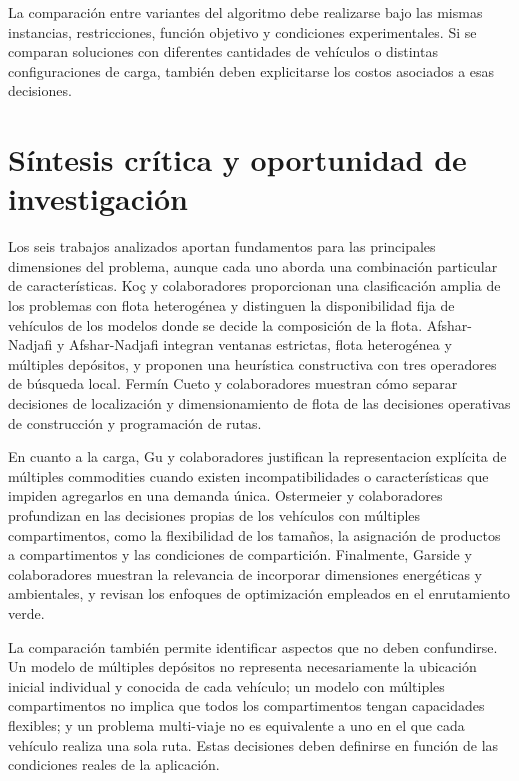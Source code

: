 La comparación entre variantes del algoritmo debe realizarse bajo las mismas instancias, restricciones, función objetivo y condiciones experimentales. Si se comparan soluciones con diferentes cantidades de vehículos o distintas configuraciones de carga, también deben explicitarse los costos asociados a esas decisiones.

\section{Síntesis crítica y oportunidad de investigación}
\label{sec:sintesis}

Los seis trabajos analizados aportan fundamentos para las principales dimensiones del problema, aunque cada uno aborda una combinación particular de características. Ko\c{c} y colaboradores proporcionan una clasificación amplia de los problemas con flota heterogénea y distinguen la disponibilidad fija de vehículos de los modelos donde se decide la composición de la flota. Afshar-Nadjafi y Afshar-Nadjafi integran ventanas estrictas, flota heterogénea y múltiples depósitos, y proponen una heurística constructiva con tres operadores de búsqueda local. Fermín Cueto y colaboradores muestran cómo separar decisiones de localización y dimensionamiento de flota de las decisiones operativas de construcción y programación de rutas.

En cuanto a la carga, Gu y colaboradores justifican la representacion explícita de múltiples commodities cuando existen incompatibilidades o características que impiden agregarlos en una demanda única. Ostermeier y colaboradores profundizan en las decisiones propias de los vehículos con múltiples compartimentos, como la flexibilidad de los tamaños, la asignación de productos a compartimentos y las condiciones de compartición. Finalmente, Garside y colaboradores muestran la relevancia de incorporar dimensiones energéticas y ambientales, y revisan los enfoques de optimización empleados en el enrutamiento verde.

La comparación también permite identificar aspectos que no deben confundirse. Un modelo de múltiples depósitos no representa necesariamente la ubicación inicial individual y conocida de cada vehículo; un modelo con múltiples compartimentos no implica que todos los compartimentos tengan capacidades flexibles; y un problema multi-viaje no es equivalente a uno en el que cada vehículo realiza una sola ruta. Estas decisiones deben definirse en función de las condiciones reales de la aplicación.

